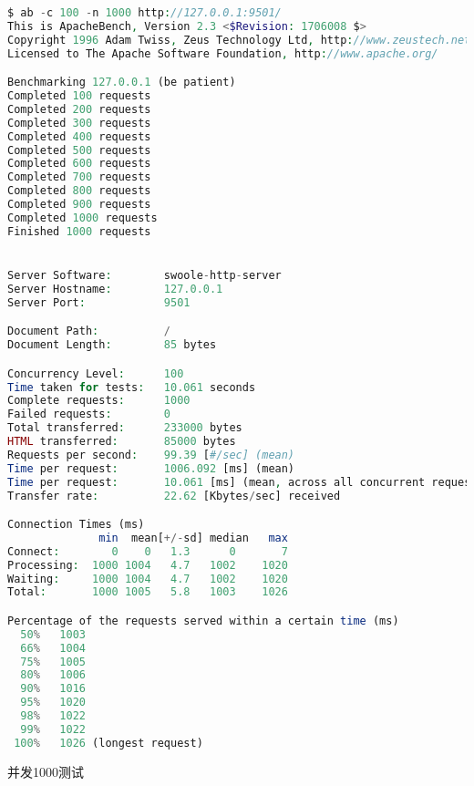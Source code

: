 \begin{lstlisting}[language=PHP]
$ ab -c 100 -n 1000 http://127.0.0.1:9501/
This is ApacheBench, Version 2.3 <$Revision: 1706008 $>
Copyright 1996 Adam Twiss, Zeus Technology Ltd, http://www.zeustech.net/
Licensed to The Apache Software Foundation, http://www.apache.org/

Benchmarking 127.0.0.1 (be patient)
Completed 100 requests
Completed 200 requests
Completed 300 requests
Completed 400 requests
Completed 500 requests
Completed 600 requests
Completed 700 requests
Completed 800 requests
Completed 900 requests
Completed 1000 requests
Finished 1000 requests


Server Software:        swoole-http-server
Server Hostname:        127.0.0.1
Server Port:            9501

Document Path:          /
Document Length:        85 bytes

Concurrency Level:      100
Time taken for tests:   10.061 seconds
Complete requests:      1000
Failed requests:        0
Total transferred:      233000 bytes
HTML transferred:       85000 bytes
Requests per second:    99.39 [#/sec] (mean)
Time per request:       1006.092 [ms] (mean)
Time per request:       10.061 [ms] (mean, across all concurrent requests)
Transfer rate:          22.62 [Kbytes/sec] received

Connection Times (ms)
              min  mean[+/-sd] median   max
Connect:        0    0   1.3      0       7
Processing:  1000 1004   4.7   1002    1020
Waiting:     1000 1004   4.7   1002    1020
Total:       1000 1005   5.8   1003    1026

Percentage of the requests served within a certain time (ms)
  50%   1003
  66%   1004
  75%   1005
  80%   1006
  90%   1016
  95%   1020
  98%   1022
  99%   1022
 100%   1026 (longest request)
\end{lstlisting}

并发1000测试



